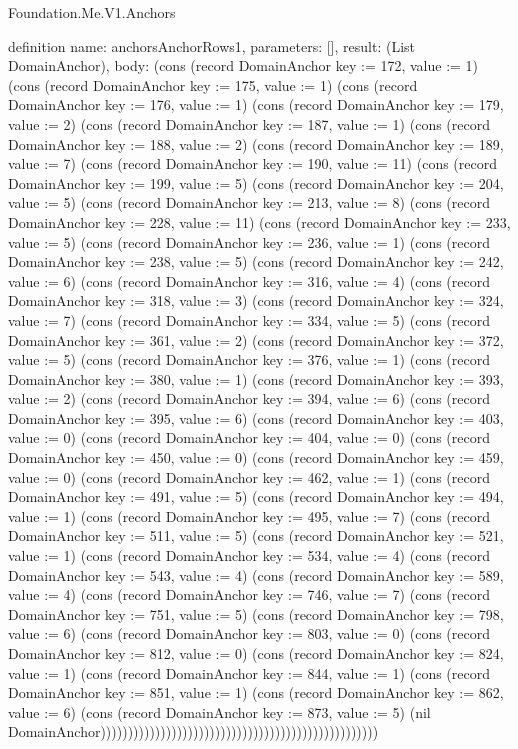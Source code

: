 \begin{lexlean}{Foundation.Me.V1.Anchors}
\begin{semanticmodule}
definition{
  name: anchorsAnchorRows1,
  parameters: [],
  result: (List DomainAnchor),
  body: (cons (record DomainAnchor {key := 172, value := 1}) (cons (record DomainAnchor {key := 175, value := 1}) (cons (record DomainAnchor {key := 176, value := 1}) (cons (record DomainAnchor {key := 179, value := 2}) (cons (record DomainAnchor {key := 187, value := 1}) (cons (record DomainAnchor {key := 188, value := 2}) (cons (record DomainAnchor {key := 189, value := 7}) (cons (record DomainAnchor {key := 190, value := 11}) (cons (record DomainAnchor {key := 199, value := 5}) (cons (record DomainAnchor {key := 204, value := 5}) (cons (record DomainAnchor {key := 213, value := 8}) (cons (record DomainAnchor {key := 228, value := 11}) (cons (record DomainAnchor {key := 233, value := 5}) (cons (record DomainAnchor {key := 236, value := 1}) (cons (record DomainAnchor {key := 238, value := 5}) (cons (record DomainAnchor {key := 242, value := 6}) (cons (record DomainAnchor {key := 316, value := 4}) (cons (record DomainAnchor {key := 318, value := 3}) (cons (record DomainAnchor {key := 324, value := 7}) (cons (record DomainAnchor {key := 334, value := 5}) (cons (record DomainAnchor {key := 361, value := 2}) (cons (record DomainAnchor {key := 372, value := 5}) (cons (record DomainAnchor {key := 376, value := 1}) (cons (record DomainAnchor {key := 380, value := 1}) (cons (record DomainAnchor {key := 393, value := 2}) (cons (record DomainAnchor {key := 394, value := 6}) (cons (record DomainAnchor {key := 395, value := 6}) (cons (record DomainAnchor {key := 403, value := 0}) (cons (record DomainAnchor {key := 404, value := 0}) (cons (record DomainAnchor {key := 450, value := 0}) (cons (record DomainAnchor {key := 459, value := 0}) (cons (record DomainAnchor {key := 462, value := 1}) (cons (record DomainAnchor {key := 491, value := 5}) (cons (record DomainAnchor {key := 494, value := 1}) (cons (record DomainAnchor {key := 495, value := 7}) (cons (record DomainAnchor {key := 511, value := 5}) (cons (record DomainAnchor {key := 521, value := 1}) (cons (record DomainAnchor {key := 534, value := 4}) (cons (record DomainAnchor {key := 543, value := 4}) (cons (record DomainAnchor {key := 589, value := 4}) (cons (record DomainAnchor {key := 746, value := 7}) (cons (record DomainAnchor {key := 751, value := 5}) (cons (record DomainAnchor {key := 798, value := 6}) (cons (record DomainAnchor {key := 803, value := 0}) (cons (record DomainAnchor {key := 812, value := 0}) (cons (record DomainAnchor {key := 824, value := 1}) (cons (record DomainAnchor {key := 844, value := 1}) (cons (record DomainAnchor {key := 851, value := 1}) (cons (record DomainAnchor {key := 862, value := 6}) (cons (record DomainAnchor {key := 873, value := 5}) (nil DomainAnchor)))))))))))))))))))))))))))))))))))))))))))))))))))
}


\end{semanticmodule}
\end{lexlean}
